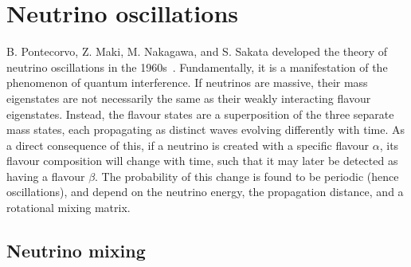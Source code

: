 \section{Neutrino oscillations} %
\label{sec:theory_oscillations} %

B. Pontecorvo, Z. Maki, M. Nakagawa, and S. Sakata developed the theory of neutrino oscillations
in the 1960s~\cite{maki1962, pontecorvo1967, pontecorvo1969}. Fundamentally, it is a manifestation
of the phenomenon of quantum interference. If neutrinos are massive, their mass eigenstates are
not necessarily the same as their weakly interacting flavour eigenstates. Instead, the flavour
states are a superposition of the three separate mass states, each propagating as distinct waves
evolving differently with time. As a direct consequence of this, if a neutrino is created with a
specific flavour $\alpha$, its flavour composition will change with time, such that it may later
be detected as having a flavour $\beta$. The probability of this change is found to be periodic
(hence oscillations), and depend on the neutrino energy, the propagation distance, and a
rotational mixing matrix.

\subsection{Neutrino mixing} %
\label{sec:theory_oscillations_mixing} %

